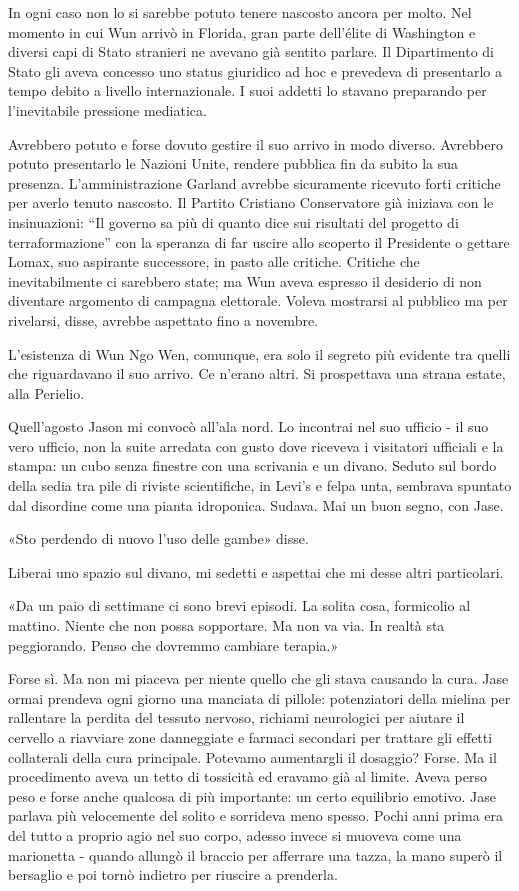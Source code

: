 In ogni caso non lo si sarebbe potuto tenere nascosto ancora per molto.
Nel momento in cui Wun arrivò in Florida, gran parte dell'élite di
Washington e diversi capi di Stato stranieri ne avevano già sentito
parlare. Il Dipartimento di Stato gli aveva concesso uno status
giuridico ad hoc e prevedeva di presentarlo a tempo debito a livello
internazionale. I suoi addetti lo stavano preparando per l'inevitabile
pressione mediatica.

Avrebbero potuto e forse dovuto gestire il suo arrivo in modo diverso.
Avrebbero potuto presentarlo le Nazioni Unite, rendere pubblica fin da
subito la sua presenza. L'amministrazione Garland avrebbe sicuramente
ricevuto forti critiche per averlo tenuto nascosto. Il Partito Cristiano
Conservatore già iniziava con le insinuazioni: ``Il governo sa più di
quanto dice sui risultati del progetto di terraformazione'' con la
speranza di far uscire allo scoperto il Presidente o gettare Lomax, suo
aspirante successore, in pasto alle critiche. Critiche che
inevitabilmente ci sarebbero state; ma Wun aveva espresso il desiderio
di non diventare argomento di campagna elettorale. Voleva mostrarsi al
pubblico ma per rivelarsi, disse, avrebbe aspettato fino a novembre.

L'esistenza di Wun Ngo Wen, comunque, era solo il segreto più evidente
tra quelli che riguardavano il suo arrivo. Ce n'erano altri. Si
prospettava una strana estate, alla Perielio.

Quell'agosto Jason mi convocò all'ala nord. Lo incontrai nel suo ufficio
- il suo vero ufficio, non la suite arredata con gusto dove riceveva i
visitatori ufficiali e la stampa: un cubo senza finestre con una
scrivania e un divano. Seduto sul bordo della sedia tra pile di riviste
scientifiche, in Levi's e felpa unta, sembrava spuntato dal disordine
come una pianta idroponica. Sudava. Mai un buon segno, con Jase.

«Sto perdendo di nuovo l'uso delle gambe» disse.

Liberai uno spazio sul divano, mi sedetti e aspettai che mi desse altri
particolari.

«Da un paio di settimane ci sono brevi episodi. La solita cosa,
formicolio al mattino. Niente che non possa sopportare. Ma non va via.
In realtà sta peggiorando. Penso che dovremmo cambiare terapia.»

Forse sì. Ma non mi piaceva per niente quello che gli stava causando la
cura. Jase ormai prendeva ogni giorno una manciata di pillole:
potenziatori della mielina per rallentare la perdita del tessuto
nervoso, richiami neurologici per aiutare il cervello a riavviare zone
danneggiate e farmaci secondari per trattare gli effetti collaterali
della cura principale. Potevamo aumentargli il dosaggio? Forse. Ma il
procedimento aveva un tetto di tossicità ed eravamo già al limite. Aveva
perso peso e forse anche qualcosa di più importante: un certo equilibrio
emotivo. Jase parlava più velocemente del solito e sorrideva meno
spesso. Pochi anni prima era del tutto a proprio agio nel suo corpo,
adesso invece si muoveva come una marionetta - quando allungò il braccio
per afferrare una tazza, la mano superò il bersaglio e poi tornò
indietro per riuscire a prenderla.


